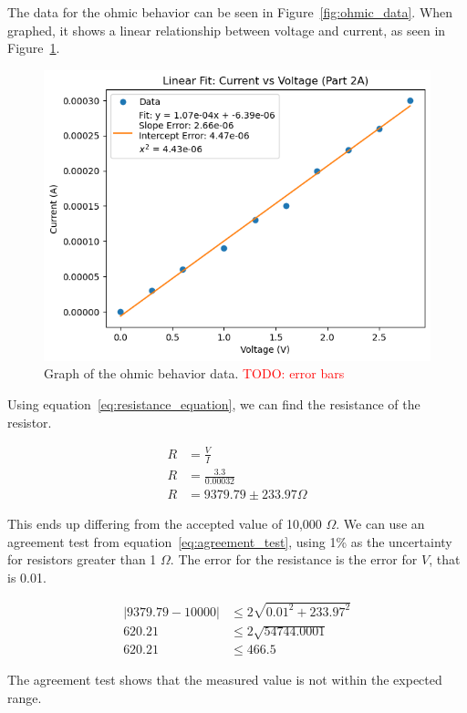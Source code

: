 \documentclass[11pt]{article}
\newcommand{\todo}[1]{\textcolor{red}{TODO: #1}\PackageWarning{TODO:}{#1!}}
\begin{document}
    The data for the ohmic behavior can be seen in Figure~\ref{fig:ohmic_data}.
    When graphed, it shows a linear relationship between voltage and current, as seen in Figure~\ref{fig:ohmic_graph}.
    \begin{figure}[h!]
        \centering
        \includegraphics[width=1.0\linewidth]{resources/images/part2a_ohmic_graph}
        \caption{Graph of the ohmic behavior data. \todo{error bars}} %
        \label{fig:ohmic_graph}
    \end{figure}

    Using equation~\ref{eq:resistance_equation}, we can find the resistance of the resistor.
    \begin{e}
        \begin{align*}
            R &= \frac{V}{I} \\
            R &= \frac{3.3}{0.00032} \\
            R &= 9379.79 \pm 233.97 \Omega
        \end{align*}
    \end{e}
    This ends up differing from the accepted value of 10,000 $\Omega$.
    We can use an agreement test from equation~\ref{eq:agreement_test}, using 1\% as the uncertainty for resistors
    greater than 1 $\Omega$.
    The error for the resistance is the error for $V$, that is 0.01.
    \begin{e}
        \begin{align*}
            |9379.79 - 10000| &\le 2 \sqrt{0.01^2 + 233.97^2} \\
            620.21 &\le 2 \sqrt{54744.0001} \\
            620.21 &\le 466.5
        \end{align*}
    \end{e}
    The agreement test shows that the measured value is not within the expected range.
\end{document}
